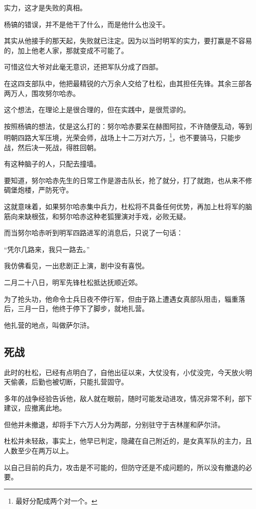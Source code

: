 \begin{multicols}{\theparacolNo}
实力，这才是失败的真相。

杨镐的错误，并不是他干了什么，而是他什么也没干。

其实从他接手的那天起，失败就已注定。因为以当时明军的实力，要打赢是不容易的，加上他老人家，那就变成不可能了。

可惜这位大爷对此毫无意识，还把军队分成了四部。

在这四支部队中，他把最精锐的六万余人交给了杜松，由其担任先锋。其余三部各两万人，围攻努尔哈赤。

这个想法，在理论上是很合理的，但在实践中，是很荒谬的。

按照杨镐的想法，仗是这么打的：努尔哈赤要呆在赫图阿拉，不许随便乱动，等到明朝四路大军压境，光荣会师，战场上十二万对六万，\footnote{最好分配成两个对一个。}，也不要骑马，只能步战，然后决一死战，得胜回朝。

有这种脑子的人，只配去撞墙。

要知道，努尔哈赤先生的日常工作是游击队长，抢了就分，打了就跑，也从来不修碉堡炮楼，严防死守。

这就意味着，如果努尔哈赤集中兵力，杜松将不具备任何优势，再加上杜将军的脑筋向来缺根弦，和努尔哈赤这种老狐狸演对手戏，必败无疑。

而当努尔哈赤听到明军四路进军的消息后，只说了一句话：

“凭尔几路来，我只一路去。”

我仿佛看见，一出悲剧正上演，剧中没有喜悦。

二月二十八日，明军先锋杜松抵达抚顺近郊。

为了抢头功，他命令士兵日夜不停行军，但由于路上遭遇女真部队阻击，辎重落后，三月一日，他终于停下了脚步，就地扎营。

他扎营的地点，叫做萨尔浒。

\subsection{死战}
此时的杜松，已经有点明白了，自他出征以来，大仗没有，小仗没完，今天放火明天偷袭，后勤也被切断，只能扎营固守。

多年的战争经验告诉他，敌人就在眼前，随时可能发动进攻，情况非常不利，部下建议，应撤离此地。

但他并未撤退，却将手下六万人分为两部，分别驻守于吉林崖和萨尔浒。

杜松并未轻敌，事实上，他早已判定，隐藏在自己附近的，是女真军队的主力，且人数至少在两万以上。

以自己目前的兵力，攻击是不可能的，但防守还是不成问题的，所以没有撤退的必要。


\end{multicols}

